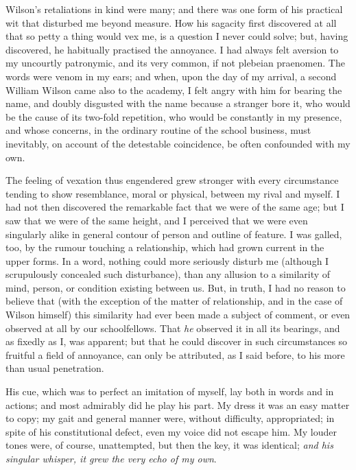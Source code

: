 \documentclass[12pt]{book}
\begin{document}
     Wilson's retaliations in kind were many; and there was one
form of his practical wit that disturbed me beyond measure.  How
his sagacity first discovered at all that so petty a thing would
vex me, is a question I never could solve; but, having discovered,
he habitually practised the annoyance.  I had always felt aversion
to my uncourtly patronymic, and its very common, if not plebeian
praenomen.  The words were venom in my ears; and when, upon the day
of my arrival, a second William Wilson came also to the academy, I
felt angry with him for bearing the name, and doubly disgusted with
the name because a stranger bore it, who would be the cause of its
two-fold repetition, who would be constantly in my presence, and
whose concerns, in the ordinary routine of the  school
business, must inevitably, on account of the detestable
coincidence, be often confounded with my own.

     The feeling of vexation thus engendered grew stronger with
every circumstance tending to show resemblance, moral or physical,
between my rival and myself.  I had not then discovered the
remarkable fact that we were of the same age; but I saw that we
were of the same height, and I perceived that we were even
singularly alike in general contour of person and outline of
feature.  I was galled, too, by the rumour touching a relationship,
which had grown current in the upper forms.  In a word, nothing
could more seriously disturb me (although I scrupulously concealed
such disturbance), than any allusion to a similarity of mind,
person, or condition existing between us.  But, in truth, I had no
reason to believe that (with the exception of the matter of
relationship, and in the case of Wilson himself) this similarity
had ever been made a subject of comment, or even observed at all by
our schoolfellows.  That \emph{he} observed it in all its bearings,
and as fixedly as I, was apparent; but that he could discover in
such circumstances so fruitful a field of annoyance, can only be
attributed, as I said before, to his more than usual penetration.

     His cue, which was to perfect an imitation of myself, lay both
in words and in actions; and most admirably did he play his part. 
My dress it was an easy matter to copy; my gait and general manner
were, without difficulty, appropriated; in spite of his
constitutional defect, even my voice did not escape him.  My louder
tones were, of course, unattempted, but then the key, it was
identical; \emph{and his singular whisper, it grew the very echo of my
own}.
\end{document}
